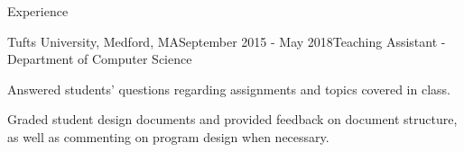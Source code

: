 \documentclass{resume} %
\begin{document}
\begin{rSection}{Experience}


\begin{rSubsection}{Tufts University, Medford, MA}{September 2015 -
    May 2018}{Teaching Assistant - Department of Computer Science}

\item Answered students' questions regarding assignments and topics covered in
    class.

\item Graded student design documents and provided feedback on document
    structure, as well as commenting on program design when necessary.

\end{rSubsection}








\smallskip

\end{rSection}
\end{document}
